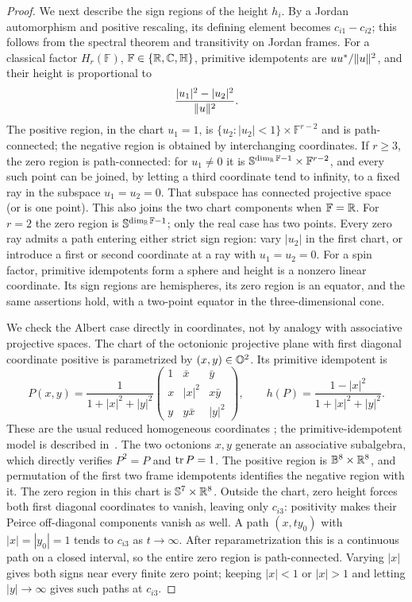 \begin{proof}
We next describe the sign regions of the height $h_i$.  By a Jordan automorphism and
positive rescaling, its defining element becomes $c_{i1}-c_{i2}$;
this follows from the spectral theorem and transitivity on Jordan
frames.  For a classical factor $H_r(\mathbb F)$,
$\mathbb F\in\{\mathbb R,\mathbb C,\mathbb H\}$, primitive idempotents are
$uu^*/\lVert u\rVert^2$, and their height is proportional to
\[
 \frac{|u_1|^2-|u_2|^2}{\lVert u\rVert^2}.
\]
The positive region, in the chart $u_1=1$, is
$\{u_2:|u_2|<1\}\times\mathbb F^{r-2}$ and is path-connected;
the negative region is obtained by interchanging coordinates.
If $r\geq3$, the zero region is path-connected: for $u_1\ne0$ it is
$\mathbb S^{\dim_\mathbb R\mathbb F-1}\times\mathbb F^{r-2}$, and every such
point can be joined, by letting a third coordinate tend to infinity,
to a fixed ray in the subspace $u_1=u_2=0$.
That subspace has connected projective space (or is one point).
This also joins the two chart components when $\mathbb F=\mathbb R$.
For $r=2$ the zero region is
$\mathbb S^{\dim_\mathbb R\mathbb F-1}$; only the real case has two points.
Every zero ray admits a path entering either strict sign region:
vary $|u_2|$ in the first chart, or introduce a first or second
coordinate at a ray with $u_1=u_2=0$.
For a spin factor, primitive idempotents form a sphere and height is
a nonzero linear coordinate.  Its sign regions are hemispheres, its
zero region is an equator, and the same assertions hold, with a
two-point equator in the three-dimensional cone.

We check the Albert case directly in coordinates, not by analogy with
associative projective spaces.
The chart of the octonionic projective plane with first diagonal
coordinate positive is parametrized by $(x,y)\in\mathbb O^2$.
Its primitive idempotent is
\begin{equation}\label{eq:balance-albert-chart}
 P(x,y)=\frac{1}{1+|x|^2+|y|^2}
 \begin{pmatrix}
 1&\bar x&\bar y\\
 x&|x|^2&x\bar y\\
 y&y\bar x&|y|^2
 \end{pmatrix},
 \qquad
 h(P)=\frac{1-|x|^2}{1+|x|^2+|y|^2}.
\end{equation}
These are the usual reduced homogeneous coordinates
\cite[Section~3]{HSV2009}; the primitive-idempotent model is described
in~\cite{Baez2002}.  The two octonions $x,y$ generate an associative
subalgebra, which directly verifies $P^2=P$ and $\operatorname{tr} P=1$.
The positive region is $\mathbb B^8\times\mathbb R^8$, and permutation of the first
two frame idempotents identifies the negative region with it.
The zero region in this chart is $\mathbb S^7\times\mathbb R^8$.
Outside the chart, zero height forces both first diagonal coordinates
to vanish, leaving only $c_{i3}$: positivity makes their Peirce
off-diagonal components vanish as well.  A path $(x,ty_0)$ with
$|x|=|y_0|=1$ tends to $c_{i3}$ as $t\to\infty$.
After reparametrization this is a continuous path on a closed interval,
so the entire zero region is path-connected.  Varying $|x|$ gives both
signs near every finite zero point; keeping $|x|<1$ or $|x|>1$ and
letting $|y|\to\infty$ gives such paths at $c_{i3}$.


\end{proof}
